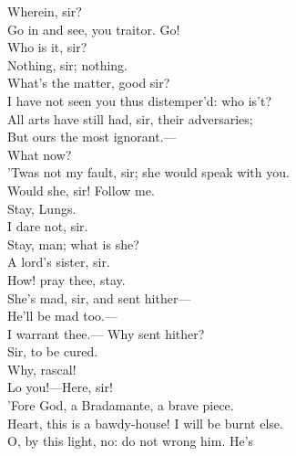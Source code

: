 \documentclass[a4paper,oneside]{memoir}
\begin{document}
\begin{drama*}
\facespeaks {} Wherein, sir?\\
\subtlespeaks Go in and see, you traitor. Go!\\
\mammonspeaks {} Who is it, sir?\\
\subtlespeaks Nothing, sir; nothing.\\
\mammonspeaks {} What's the matter, good sir?\\
I have not seen you thus distemper'd: who is't?\\
\subtlespeaks All arts have still had, sir, their adversaries;\\
But ours the most ignorant.---\\
 What now?\\
\facespeaks 'Twas not my fault, sir; she would speak with you.\\
\subtlespeaks Would she, sir! Follow me.\\
\mammonspeaks {}  Stay, Lungs.\\
\facespeaks {} I dare not, sir.\\
\mammonspeaks Stay, man; what is she?\\
\facespeaks {} A lord's sister, sir.\\
\mammonspeaks How! pray thee, stay.\\
\facespeaks {} She's mad, sir, and sent hither---\\
He'll be mad too.---\\
\mammonspeaks {} I warrant thee.--- Why sent hither?\\
\facespeaks Sir, to be cured.\\
\subtlespeaks {}  Why, rascal!\\
\facespeaks {} Lo you!---Here, sir!\\
\mammonspeaks 'Fore God, a Bradamante, a brave piece.\\
\surlyspeaks Heart, this is a bawdy-house! I will be burnt else.\\
\mammonspeaks O, by this light, no: do not wrong him. He's\\

\end{drama*}
\end{document}
